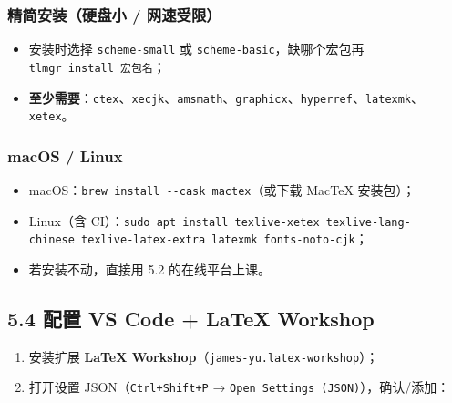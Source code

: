 \subsubsection{精简安装（硬盘小 /
网速受限）}\label{ux7cbeux7b80ux5b89ux88c5ux786cux76d8ux5c0f-ux7f51ux901fux53d7ux9650}

\begin{itemize}
\tightlist
\item
  安装时选择 \texttt{scheme-small} 或
  \texttt{scheme-basic}，缺哪个宏包再 \texttt{tlmgr\ install\ 宏包名}；
\item
  \textbf{至少需要}：\texttt{ctex}、\texttt{xecjk}、\texttt{amsmath}、\texttt{graphicx}、\texttt{hyperref}、\texttt{latexmk}、\texttt{xetex}。
\end{itemize}

\subsubsection{macOS / Linux}\label{macos-linux}

\begin{itemize}
\tightlist
\item
  macOS：\texttt{brew\ install\ -\/-cask\ mactex}（或下载 MacTeX
  安装包）；
\item
  Linux（含
  CI）：\texttt{sudo\ apt\ install\ texlive-xetex\ texlive-lang-chinese\ texlive-latex-extra\ latexmk\ fonts-noto-cjk}；
\item
  若安装不动，直接用 5.2 的在线平台上课。
\end{itemize}

\subsection{5.4 配置 VS Code + LaTeX
Workshop}\label{ux914dux7f6e-vs-code-latex-workshop}

\begin{enumerate}
\def\labelenumi{\arabic{enumi}.}
\tightlist
\item
  安装扩展 \textbf{LaTeX Workshop}（\texttt{james-yu.latex-workshop}）；
\item
  打开设置 JSON（\texttt{Ctrl+Shift+P} →
  \texttt{Open\ Settings\ (JSON)}），确认/添加：
\end{enumerate}

